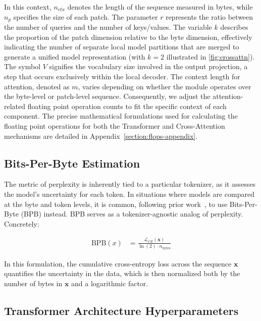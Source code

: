 In this context, $n_{ctx}$ denotes the length of the sequence measured in bytes, while $n_p$ specifies the size of each patch. The parameter $r$ represents the ratio between the number of queries and the number of keys/values. The variable $k$ describes the proportion of the patch dimension relative to the byte dimension, effectively indicating the number of separate local model partitions that are merged to generate a unified model representation (with $k=2$ illustrated in \autoref{fig:crossattn}). The symbol $V$ signifies the vocabulary size involved in the output projection, a step that occurs exclusively within the local decoder. The context length for attention, denoted as $m$, varies depending on whether the module operates over the byte-level or patch-level sequence. Consequently, we adjust the attention-related floating point operation counts to fit the specific context of each component. The precise mathematical formulations used for calculating the floating point operations for both the Transformer and Cross-Attention mechanisms are detailed in Appendix~\ref{section:flops-appendix}.

\subsection{Bits-Per-Byte Estimation} The metric of perplexity is inherently tied to a particular tokenizer, as it assesses the model's uncertainty for each token. In situations where models are compared at the byte and token levels, it is common, following prior work~\citep{xue2022byt5, yu2023megabyte, wang2024mambabyte}, to use Bits-Per-Byte (BPB) instead. BPB serves as a tokenizer-agnostic analog of perplexity. Concretely:

\begin{align}
    \text{BPB}(x)&= \frac{\mathcal{L}_{CE}(\pmb{x})}{\ln(2)\cdot n_{\text{bytes}}}
\end{align}

In this formulation, the cumulative cross-entropy loss across the sequence $\pmb{x}$ quantifies the uncertainty in the data, which is then normalized both by the number of bytes in $\pmb{x}$ and a logarithmic factor.

\subsection{Transformer Architecture Hyperparameters} 

